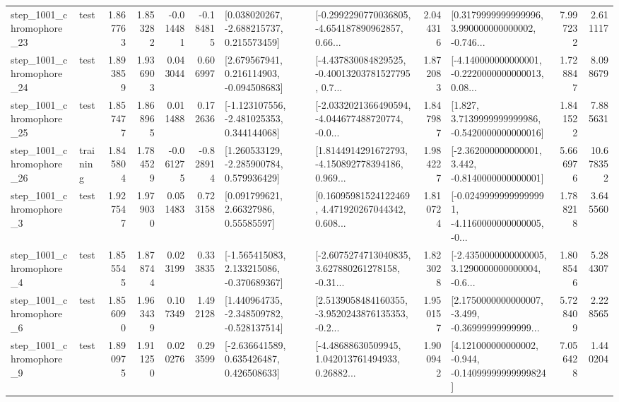 \begin{tabular}{llrrrrllrlrr}
 step\_1001\_chromophore\_23 &      test &      1.867763 &    1.853282 &     -0.014481 & -0.184815 &    [0.038020267, -2.688215737, 0.215573459] &  [-0.2992290770036805, -4.654187890962857, 0.66... &       2.044316 &  [0.3179999999999996, 3.990000000000002, -0.746... &            7.997232 &          2.611117 \\
 step\_1001\_chromophore\_24 &      test &      1.893859 &    1.936903 &      0.043044 &  0.606997 &    [2.679567941, 0.216114903, -0.094508683] &  [-4.437830084829525, -0.40013203781527795, 0.7... &       1.872083 &  [-4.140000000000001, -0.2220000000000013, 0.08... &            1.728847 &          8.098679 \\
 step\_1001\_chromophore\_25 &      test &      1.857477 &    1.868965 &      0.011488 &  0.172636 &   [-1.123107556, -2.481025353, 0.344144068] &  [-2.0332021366490594, -4.044677488720774, -0.0... &       1.847987 &   [1.827, 3.7139999999999986, -0.5420000000000016] &            1.841522 &          7.885631 \\
 step\_1001\_chromophore\_26 &  training &      1.845804 &    1.784529 &     -0.061275 & -0.828914 &    [1.260533129, -2.285900784, 0.579936429] &  [1.8144914291672793, -4.150892778394186, 0.969... &       1.984227 &   [-2.362000000000001, 3.442, -0.8140000000000001] &            5.666976 &         10.678352 \\
  step\_1001\_chromophore\_3 &      test &      1.927547 &    1.979030 &      0.051483 &  0.723158 &       [0.091799621, 2.66327986, 0.55585597] &  [0.16095981524122469, 4.471920267044342, 0.608... &       1.810724 &  [-0.02499999999999991, -4.1160000000000005, -0... &            1.788218 &          3.645560 \\
  step\_1001\_chromophore\_4 &      test &      1.855545 &    1.878744 &      0.023199 &  0.333835 &   [-1.565415083, 2.133215086, -0.370689367] &  [-2.6075274713040835, 3.627880261278158, -0.31... &       1.823028 &  [-2.4350000000000005, 3.1290000000000004, -0.6... &            1.808546 &          5.284307 \\
  step\_1001\_chromophore\_6 &      test &      1.856090 &    1.963439 &      0.107349 &  1.492128 &   [1.440964735, -2.348509782, -0.528137514] &  [2.5139058484160355, -3.9520243876135353, -0.2... &       1.950157 &  [2.1750000000000007, -3.499, -0.36999999999999... &            5.728409 &          2.228565 \\
  step\_1001\_chromophore\_9 &      test &      1.890975 &    1.911250 &      0.020276 &  0.293599 &    [-2.636641589, 0.635426487, 0.426508633] &  [-4.48688630509945, 1.042013761494933, 0.26882... &       1.900942 &  [4.121000000000002, -0.944, -0.14099999999999824] &            7.056428 &          1.440204 \\

\end{tabular}
